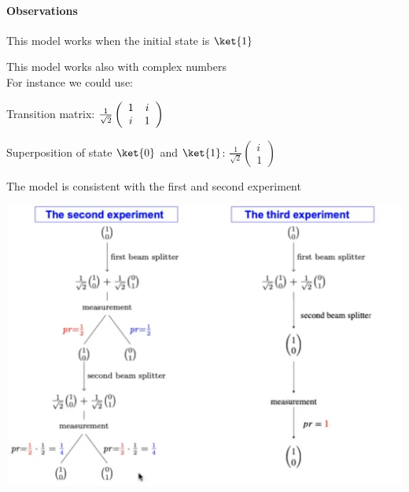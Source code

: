 \documentclass[10pt]{report}
\begin{document}
\paragraph{Observations}\begin{list}{}{}
	\item This model works when the initial state is $\ket{1}$
	\item This model works also with complex numbers\\
	For instance we could use:
	\begin{list}{}{}
		\item Transition matrix: $\frac{1}{\sqrt{2}}\left(\begin{array}{c c}
		1&i\\i&1
		\end{array}\right)$
		\item Superposition of state $\ket{0}$ and $\ket{1}$: $\frac{1}{\sqrt{2}}\left(\begin{array}{c}
		i\\1
		\end{array}\right)$
		\item The model is consistent with the first and second experiment
		\begin{center}
			\includegraphics[scale=0.5]{4.png}
		\end{center}
	\end{list}
\end{list}
\end{document}
